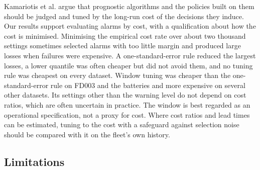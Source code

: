 \documentclass[a4paper,fleqn,doubleblind]{cas-dc}
\begin{document}
Kamariotis et al. \cite{kamariotis2024} argue that prognostic algorithms and the policies built on them should be judged and tuned by the long-run cost of the decisions they induce. Our results support evaluating alarms by cost, with a qualification about how the cost is minimised. Minimising the empirical cost rate over about two thousand settings sometimes selected alarms with too little margin and produced large losses when failures were expensive. A one-standard-error rule reduced the largest losses, a lower quantile was often cheaper but did not avoid them, and no tuning rule was cheapest on every dataset. Window tuning was cheaper than the one-standard-error rule on FD003 and the batteries and more expensive on several other datasets. Its settings other than the warning level do not depend on cost ratios, which are often uncertain in practice. The window is best regarded as an operational specification, not a proxy for cost. Where cost ratios and lead times can be estimated, tuning to the cost with a safeguard against selection noise should be compared with it on the fleet's own history.

\subsection{Limitations}
\end{document}
